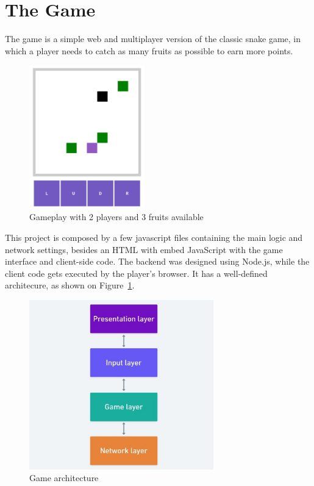 \documentclass[english]{sbrt}
\begin{document}
\section{\textbf{The Game}}
The game is a simple web and multiplayer version of the classic snake game, in which a player needs to
catch as many fruits as possible to earn more points.

\begin{figure}[H]
  \centering
  \includegraphics[width=5cm]{game-screen.jpg}
  \caption{Gameplay with 2 players and 3 fruits available}
  \label{game-screen}
\end{figure}

This project is composed by a few javascript files containing the main logic and network settings, besides an HTML with embed JavaScript with the game interface and client-side code. The backend was designed using Node.js, while the client code gets executed by the player's browser. It has a well-defined architecure, as shown on Figure~\ref{game-screen}.

\begin{figure}[H]
  \centering
  \includegraphics[width=8cm]{game-layers.jpg}
  \caption{Game architecture}
  \label{game-layers}
\end{figure}
\end{document}

